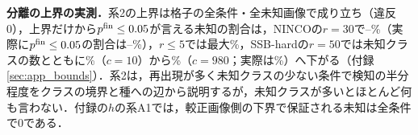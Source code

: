 \textbf{分離の上界の実測．}系2の上界は格子の全条件・全未知画像で成り立ち（違反0），上界だけから$p^{\mathrm{fin}}\le0.05$が言える未知の割合は，NINCOの$r{=}30$で\NRBdRefNincoRThirtyCertMin--\NRBdRefNincoRThirtyCertMax\%（実際に$p^{\mathrm{fin}}\le0.05$の割合は\NRBdRefNincoRThirtyActMin--\NRBdRefNincoRThirtyActMax\%），$r\le5$では最大\NRBdRefLeFiveCertMax\%，SSB-hardの$r{=}50$では未知クラスの数とともに\NRBdRefSsbCTenRFiftyCert\%（$c{=}10$）から\NRBdRefSsbCNineEightyRFiftyCert\%（$c{=}980$；実際は\NRBdRefSsbCNineEightyRFiftyAct\%）へ下がる（付録\ref{sec:app_bounds}）．系2は，再出現が多く未知クラスの少ない条件で検知の半分程度をクラスの境界と種への辺から説明するが，未知クラスが多いとほとんど何も言わない．付録の$h$の系A1では，較正画像側の下界で保証される未知は全条件で0である．
